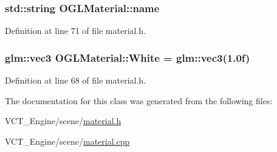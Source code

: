 \hypertarget{class_o_g_l_material_ad8c2aa701fa7d127dec2c3c4a4349ba4}{}
\subsubsection[{name}]{\setlength{\rightskip}{0pt plus 5cm}std\+::string O\+G\+L\+Material\+::name}\label{class_o_g_l_material_ad8c2aa701fa7d127dec2c3c4a4349ba4}


Definition at line 71 of file material.\+h.

\hypertarget{class_o_g_l_material_a7a222f0ece12097de05a1494144c3e27}{}
\subsubsection[{White}]{\setlength{\rightskip}{0pt plus 5cm}glm\+::vec3 O\+G\+L\+Material\+::\+White = glm\+::vec3(1.\+0f)\hspace{0.3cm}{\ttfamily [static]}}\label{class_o_g_l_material_a7a222f0ece12097de05a1494144c3e27}


Definition at line 68 of file material.\+h.



The documentation for this class was generated from the following files\+:\begin{DoxyCompactItemize}
\item 
V\+C\+T\+\_\+\+Engine/scene/\hyperlink{material_8h}{material.\+h}\item 
V\+C\+T\+\_\+\+Engine/scene/\hyperlink{material_8cpp}{material.\+cpp}\end{DoxyCompactItemize}
